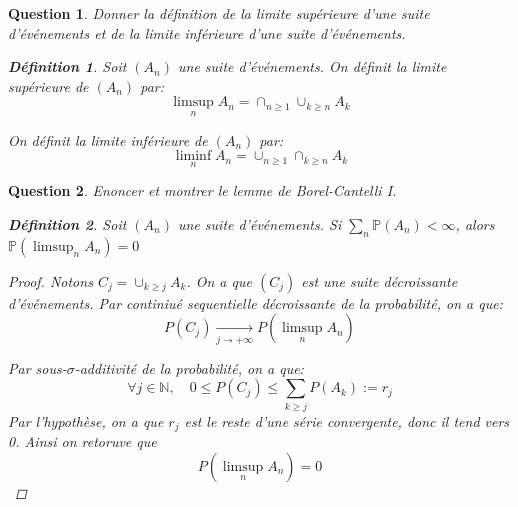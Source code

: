 \documentclass{article}
\theoremstyle{plain}
\newtheorem{question}{Question}
\theoremstyle{definition}
\newtheorem{definition}{Définition}
\begin{document}
\begin{question}
	Donner la définition de la limite supérieure d'une suite d'événements et de la limite inférieure d'une suite d'événements.
	\begin{definition}
		Soit $(A_n)$ une suite d'événements. On définit la limite supérieure de $(A_n)$ par:
		\begin{equation*}
			\limsup_n A_n = \cap_{n \geq 1} \cup_{k \geq n} A_k
		\end{equation*}

		On définit la limite inférieure de $(A_n)$ par:
		\begin{equation*}
			\liminf_n A_n = \cup_{n \geq 1} \cap_{k \geq n} A_k
		\end{equation*}
	\end{definition}
\end{question}

\begin{question}
	Enoncer et montrer le lemme de Borel-Cantelli I.
	\begin{definition}
		Soit $(A_n)$ une suite d'événements. Si
		$\sum_n \mathbb{P} (A_n) < \infty$, alors $\mathbb{P} (\limsup_n A_n) = 0$
		\begin{proof}
			Notons $C_j = \cup_{k \geq j} A_k$. On a que $(C_j)$ est une suite décroissante d'événements.
			Par continiué sequentielle décroissante de la probabilité, on a que:
			$$ P(C_j) \underset{j\to +\infty}{\longrightarrow} P(\limsup_n A_n)$$

			Par sous-$\sigma$-additivité de la probabilité, on a que:
			$$ \forall j \in \mathbb{N}, \quad 0 \leq P(C_j) \leq \sum_{k \geq j} P(A_k) := r_j$$
			Par l'hypothèse, on a que $r_j$ est le reste d'une série convergente, donc il tend vers 0.
			Ainsi on retoruve que
			$$ P(\limsup_n A_n) = 0$$
		\end{proof}
	\end{definition}
\end{question}
\end{document}
